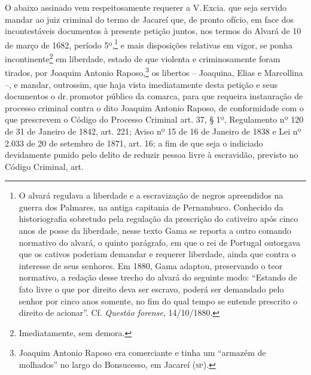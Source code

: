 O abaixo assinado vem respeitosamente requerer a V.\,Excia. que seja
servido mandar ao juiz criminal do termo de Jacareí que, de pronto
ofício, em face dos incontestáveis documentos à presente petição juntos,
nos termos do Alvará de 10 de março de 1682, período 5º,\footnote{ O
  alvará regulava a liberdade e a escravização de negros apreendidos na
  guerra dos Palmares, na antiga capitania de Pernambuco. Conhecido da
  historiografia sobretudo pela regulação da prescrição do cativeiro
  após cinco anos de posse da liberdade, nesse texto Gama se reporta a
  outro comando normativo do alvará, o quinto parágrafo, em que o rei de
  Portugal outorgava que os cativos poderiam demandar e requerer
  liberdade, ainda que contra o interesse de seus senhores. Em 1880,
  Gama adaptou, preservando o teor normativo, a redação desse trecho do
  alvará do seguinte modo: ``Estando de fato livre o que por direito deva
  ser escravo, poderá ser demandado pelo senhor por cinco anos somente,
  no fim do qual tempo se entende prescrito o direito de acionar''. Cf.
  \emph{Questão forense}, 14/10/1880.} e mais disposições relativas em
vigor, se ponha incontinente\footnote{ Imediatamente, sem demora.} em
liberdade, estado de que violenta e criminosamente foram tirados, por
Joaquim Antonio Raposo,\footnote{ Joaquim Antonio Raposo era
  comerciante e tinha um ``armazém de molhados'' no largo do Bonsucesso,
  em Jacareí (\textsc{sp}).} os libertos -- Joaquina, Elias e Marcollina --, e
mandar, outrossim, que haja vista imediatamente desta petição e seus
documentos o dr.\,promotor público da comarca, para que requeira
instauração de processo criminal contra o dito Joaquim Antonio Raposo,
de conformidade com o que prescrevem o Código do Processo Criminal art.
37, § 1º, Regulamento nº 120 de 31 de Janeiro de 1842, art. 221; Aviso
nº 15 de 16 de Janeiro de 1838 e Lei nº 2.033 de 20 de setembro de 1871,
art. 16; a fim de que seja o indiciado devidamente punido pelo delito de
reduzir pessoa livre à escravidão, previsto no Código Criminal, art.
